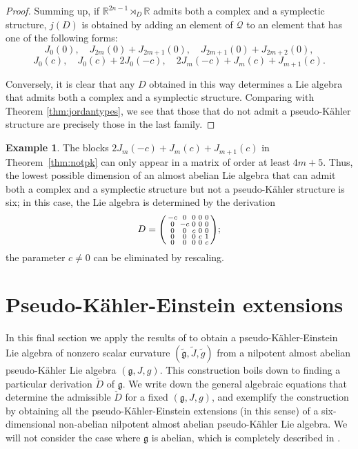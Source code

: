 \documentclass{article}
\theoremstyle{definition}
\newtheorem{example}[theorem]{Example}
\newcommand{\R}{\mathbb{R}}
\newcommand{\frg}{\mathfrak{g}}
\newcommand{\lie}[1]{\mathfrak{#1}}
\newcommand{\g}{\lie g}
\newenvironment{smallpmatrix}{\left(\begin{smallmatrix}}{\end{smallmatrix}\right)}
\begin{document}
\begin{proof}
    Summing up, if $\R^{2n-1}\rtimes_D\R$ admits both a complex and a symplectic structure, $j(D)$ is obtained by adding an element of $\mathcal{Q}$ to an element that has one of the following forms: $$J_0(0),\quad J_{2m}(0)+J_{2m+1}(0),\quad J_{2m+1}(0)+J_{2m+2}(0),$$ $$J_0(c),\quad J_0(c)+2J_0(-c),\quad 2J_m(-c)+J_m(c)+J_{m+1}(c).$$
    
    Conversely, it is clear that any $D$ obtained in this way determines a Lie algebra that admits both a complex and a symplectic structure. Comparing with Theorem \ref{thm:jordantypes}, we see that those that do not admit a pseudo-Kähler structure are precisely those in the last family.
\end{proof}

\begin{example}\label{example:6d_CS_noPK}
    The blocks $2J_m(-c)+J_m(c)+J_{m+1}(c)$ in Theorem~\ref{thm:notpk} can only appear in a matrix of order at least $4m+5$. Thus, the lowest possible dimension of an almost abelian Lie algebra that can admit both a complex and a symplectic structure but not a pseudo-K\"ahler structure is six; in this case, the Lie algebra is determined by the derivation $$D=\begin{smallpmatrix}
        -c & 0 & 0 & 0 & 0\\
        0 & -c & 0 & 0 & 0\\
        0 & 0 & c & 0 & 0\\
        0 & 0 & 0 & c & 1\\
        0 & 0 & 0 & 0 & c
    \end{smallpmatrix};$$ the parameter $c\neq0$ can be eliminated by rescaling.
\end{example}


\section{Pseudo-Kähler-Einstein extensions}\label{section:PKE_extensions}

In this final section we apply the results of \cite{Conti_Rossi_SegnanDalmasso_2023} to obtain a pseudo-Kähler-Einstein Lie algebra of nonzero scalar curvature $(\tilde{\frg},\tilde{J},\tilde{g})$ from a nilpotent almost abelian pseudo-Kähler Lie algebra $(\frg,J,g)$. This construction boils down to finding a particular derivation $\check{D}$ of $\frg$. We write down the general algebraic equations that determine the admissible $\check D$ for a fixed $(\frg,J,g)$, and exemplify the construction by obtaining all the pseudo-Kähler-Einstein extensions (in this sense) of a six-dimensional non-abelian nilpotent almost abelian pseudo-Kähler Lie algebra. We will not consider the case where $\g$ is abelian, which is completely described in \cite{Conti_Rossi_SegnanDalmasso_2023}.\medskip
\end{document}

